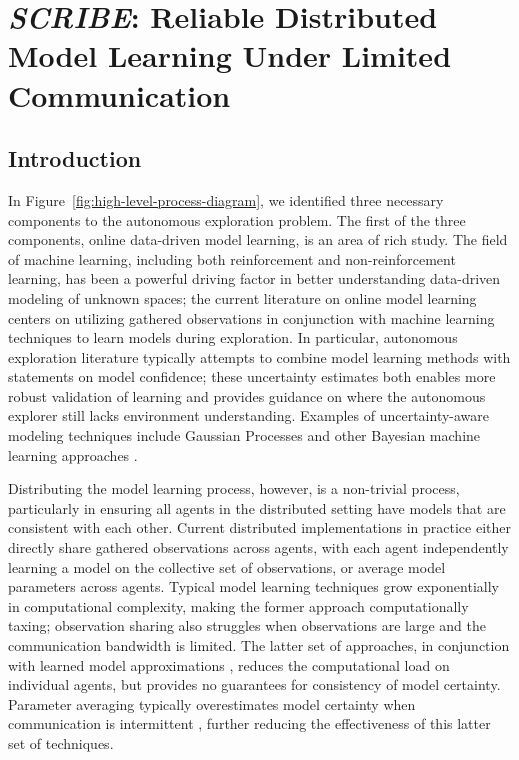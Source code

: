 \chapter{\textit{SCRIBE}: Reliable Distributed Model Learning Under Limited Communication} \label{chap:scribe}

\section{Introduction}
In Figure~\ref{fig:high-level-process-diagram}, we identified three necessary components to the autonomous exploration problem. The first of the three components, online data-driven model learning, is an area of rich study. The field of machine learning, including both reinforcement and non-reinforcement learning, has been a powerful driving factor in better understanding data-driven modeling of unknown spaces; the current literature on online model learning centers on utilizing gathered observations in conjunction with machine learning techniques to learn models during exploration. In particular, autonomous exploration literature typically attempts to combine model learning methods with statements on model confidence; these uncertainty estimates both enables more robust validation of learning and provides guidance on where the autonomous explorer still lacks environment understanding. Examples of uncertainty-aware modeling techniques include Gaussian Processes and other Bayesian machine learning approaches \cite{viseras2016decentralized, allamraju2017communication}.

Distributing the model learning process, however, is a non-trivial process, particularly in ensuring all agents in the distributed setting have models that are consistent with each other. Current distributed implementations in practice either directly share gathered observations across agents, with each agent independently learning a model on the collective set of observations, or average model parameters across agents. Typical model learning techniques grow exponentially in computational complexity, making the former approach computationally taxing; observation sharing also struggles when observations are large and the communication bandwidth is limited. The latter set of approaches, in conjunction with learned model approximations \cite{jang2020multi}, reduces the computational load on individual agents, but provides no guarantees for consistency of model certainty. Parameter averaging typically overestimates model certainty when communication is intermittent \cite{chen2002estimation}, further reducing the effectiveness of this latter set of techniques.

